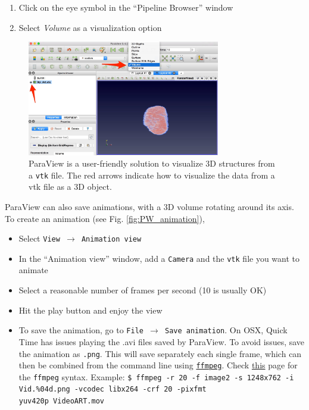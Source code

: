 \documentclass[11pt]{scrartcl}
\begin{document}
\begin{enumerate}
    \item Click on the eye symbol in the ``Pipeline Browser'' window
    \item Select {\emph{Volume}} as a visualization option
\end{enumerate}

\begin{figure}[h]
    \centering
    \includegraphics[width=0.75\textwidth]{Paraview_manual.png}
    \caption{ParaView is a user-friendly solution to visualize {\footnotesize{3D}} structures from a {\texttt{vtk}} file. The red arrows indicate how to visualize the data from a vtk file as a {\footnotesize{3D}} object.}
    \label{fig:my_label}
\end{figure}

ParaView can also save animations, with a {\footnotesize{3D}} volume rotating around its axis. To create an animation (see Fig. \ref{fig:PW_animation}),

\begin{itemize}
    \item Select {\texttt{View $\rightarrow$ Animation view}}
    \item In the ``Animation view'' window, add a {\texttt{Camera}} and the {\texttt{vtk}} file you want to animate
    \item Select a reasonable number of frames per second (10 is usually {\footnotesize{OK}})
    \item Hit the play button and enjoy the view
    \item To save the animation, go to {\texttt{File $\rightarrow$ Save animation}}. \danger On {\footnotesize{OSX}}, Quick Time has issues playing the .avi files saved by ParaView. To avoid issues, save the animation as {\texttt{.png}}. This will save separately each single frame, which can then be combined from the command line using \href{http://www.ffmpeg.org/download.html}{\texttt{ffmpeg}}. Check \href{http://hamelot.io/visualization/using-ffmpeg-to-convert-a-set-of-images-into-a-video/}{this} page for the {\texttt{ffmpeg}} syntax. Example: {\texttt{\$ ffmpeg -r 20 -f image2 -s 1248x762 -i Vid.\%04d.png -vcodec libx264 -crf 20 -pix\textunderscore fmt \\ yuv420p Video\textunderscore ART.mov}}
\end{itemize}
\end{document}
